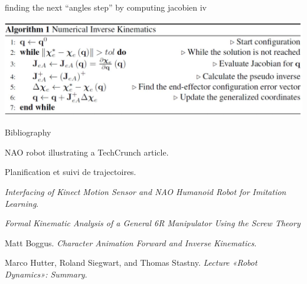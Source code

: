 \documentclass{beamer}
\begin{document}
\begin{frame}{finding the next ``angles step'' by computing jacobien iv}

\includegraphics[scale = 0.3]{eth3.PNG}\cite{6}
\end{frame}






\begin{frame}[allowframebreaks]{Bibliography}
\begin{thebibliography}{9}

NAO robot illustrating a TechCrunch article.

Planification et suivi de trajectoires. 
 
\textit{Interfacing of Kinect Motion Sensor and NAO Humanoid Robot for Imitation Learning}. 

\textit{Formal Kinematic Analysis of a General 6R Manipulator Using the Screw Theory}

Matt Boggus.
\textit{Character Animation Forward and Inverse Kinematics}.

Marco Hutter, Roland Siegwart, and Thomas Stastny.
\textit{Lecture «Robot Dynamics»: Summary}.
% 
\end{thebibliography}
\end{frame}
\end{document}
